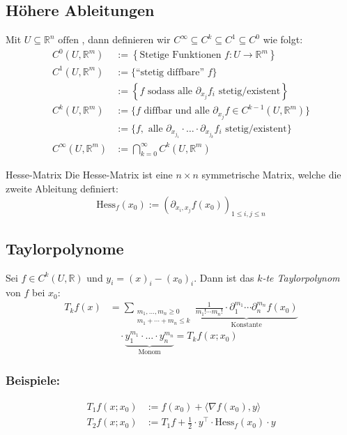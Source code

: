 \documentclass[a4paper,10pt]{article}
\begin{document}
\subsection{Höhere Ableitungen}

	Mit $U \subseteq \mathbb{R}^n \text { offen }$, dann definieren wir $C^{\infty}\subseteq C^{k} \subseteq C^{1} \subseteq C^{0}$ wie folgt:
	\begin{align*}
		C^0\left(U, \mathbb{R}^m\right)&:=\left\{\text {Stetige Funktionen } f: U \rightarrow \mathbb{R}^m\right\} \\
		C^1\left(U, \mathbb{R}^m\right)&:=\{\text {``stetig diffbare'' } f\} \\
		&:=\left\{f \text { sodass alle } \partial_{x_j} f_i \text { stetig/existent}\right\} \\
		C^k\left(U, \mathbb{R}^{m}\right) &:=\{  f \text{ diffbar und alle }\partial_{x_j} f \in C^{k-1}\left(U, \mathbb{R}^m\right) \}\\
		&:= \{ f, \text{ alle }\partial_{x_{j_1}}\cdot \dots \cdot \partial_{x_{j_k}} f_{i} \text{ stetig/existent}\}\\
		C^{\infty}(U,\mathbb{R}^{m})&:=\bigcap_{k=0}^{\infty} C^k\left(U, \mathbb{R}^m\right)
	\end{align*}


\begin{mainbox}{Hesse-Matrix}
    Die Hesse-Matrix ist eine $n \times n$ symmetrische Matrix, welche die zweite Ableitung definiert:
    $$\text{Hess}_f(x_0) := \left(\partial_{x_i, x_j}f(x_0)\right)_{1\le i,j \le n}$$ 
\end{mainbox}
\subsection{Taylorpolynome}
Sei $f \in C^{k}(U,\mathbb{R})$ und $y_i=(x)_i-(x_0)_i$. Dann ist das \textit{$k$-te Taylorpolynom} von $f$ bei $x_{0}$: 
\begin{align*}  
	T_k f(x) &= \sum_{\substack{m_1, \ldots, m_n \geqslant 0 \\ 
	m_1+\cdots+m_n \leq k}} \underbrace{ \frac{1}{m_{1} ! \cdots m_{n} !} \cdot \partial_1^{m_1} \cdots \partial_n^{m_n} f\left(x_0\right) }_{ \text{Konstante} } \\
	&\quad \cdot \underbrace{ y_1^{m_1} \cdot \ldots \cdot y_n^{m_n} }_{ \text{Monom} }=T_k f\left(x ; x_0\right)
\end{align*}

\subsubsection*{Beispiele:}
\begin{align*}
    T_1 f(x; x_0) & := f(x_0) + \langle \nabla f(x_0), y\rangle                                         \\
    T_2 f(x; x_0) & := T_1f + \frac{1}{2} \cdot y^\top \cdot \text{Hess}_f(x_0) \cdot y 
\end{align*}
\end{document}
